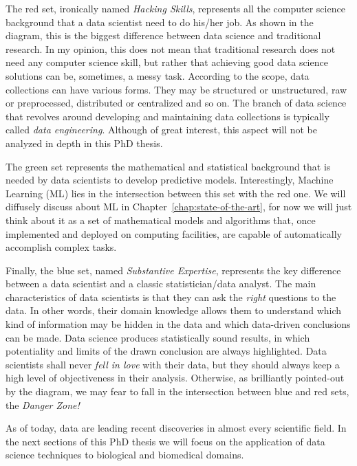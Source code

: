 The red set, ironically named \textit{Hacking Skills}, represents all the computer science background that a data scientist need to do his/her job. As shown in the diagram, this is the biggest  difference between data science and traditional research. In my opinion, this does not mean that traditional research does not need any computer science skill, but rather that achieving good data science solutions can be, sometimes, a messy task.
According to the scope, data collections can have various forms. They may be structured or unstructured, raw or preprocessed, distributed or centralized and so on. The branch of data science that revolves around developing and maintaining data collections is typically called \textit{data engineering}. Although of great interest, this aspect will not be analyzed in depth in this PhD thesis.

The green set represents the mathematical and statistical background that is needed by data scientists to develop predictive models. Interestingly, Machine Learning (\ac{ML}) lies in the intersection between this set with the red one. We will diffusely discuss about ML in Chapter~\ref{chap:state-of-the-art}, for now we will just think about it as a set of mathematical models and algorithms that, once implemented and deployed on computing facilities, are capable of automatically accomplish complex tasks.

Finally, the blue set, named \textit{Substantive Expertise}, represents the key difference between a data scientist and a classic statistician/data analyst. The main characteristics of data scientists is that they can ask the \textit{right} questions to the data. In other words, their domain knowledge allows them to understand which kind of information may be hidden in the data and which data-driven conclusions can be made. Data science produces statistically sound results, in which potentiality and limits of the drawn conclusion are always highlighted. Data scientists shall never \textit{fell in love} with their data, but they should always keep a high level of objectiveness in their analysis. Otherwise, as brilliantly pointed-out by the diagram, we may fear to fall in the intersection between blue and red sets, the \textit{Danger Zone!}


As of today, data are leading recent discoveries in almost every scientific field. In the next sections of this PhD thesis we will focus on the application of data science techniques to biological and biomedical domains.



